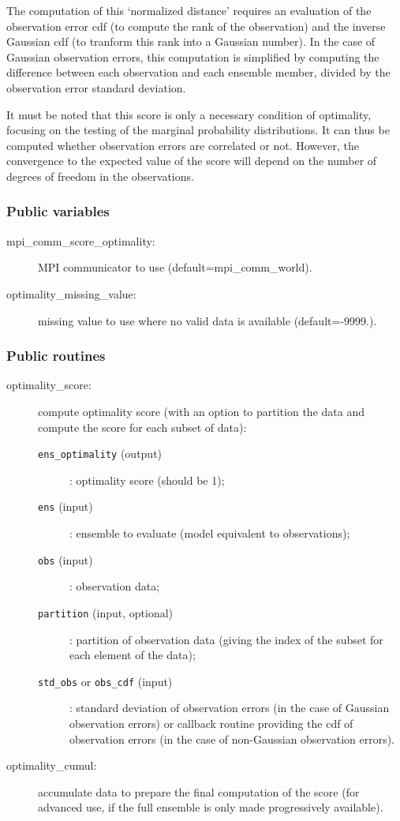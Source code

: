 \documentclass[11pt]{article}
\begin{document}
The computation of this `normalized distance' requires an evaluation
of the observation error cdf (to compute the rank of the observation)
and the inverse Gaussian cdf (to tranform this rank into a Gaussian number).
In the case of Gaussian observation errors, this computation is simplified
by computing the difference between each observation and each ensemble member,
divided by the observation error standard deviation.

It must be noted that this score is only a necessary condition of optimality,
focusing on the testing of the marginal probability distributions.
It can thus be computed whether observation errors are correlated or not.
However, the convergence to the expected value of the score
will depend on the number of degrees of freedom in the observations.

\subsubsection*{Public variables}

\begin{description}
\item[mpi\_comm\_score\_optimality:] MPI communicator to use (default=mpi\_comm\_world).
\item[optimality\_missing\_value:] missing value to use where no valid data is available (default=-9999.).
\end{description}

\subsubsection*{Public routines}

\begin{description}
\item[optimality\_score:] compute optimality score (with an option to partition the data
                    and compute the score for each subset of data):
  \begin{description}
  \item[{\tt ens\_optimality} (output)]: optimality score (should be 1);
  \item[{\tt ens} (input)]: ensemble to evaluate (model equivalent to observations);
  \item[{\tt obs} (input)]: observation data;
  \item[{\tt partition} (input, optional)]: partition of observation data
                                  (giving the index of the subset for each element of the data);
  \item[{\tt std\_obs} or {\tt obs\_cdf} (input)]: standard deviation of observation errors
                            (in the case of Gaussian observation errors) or
                            callback routine providing the cdf of observation errors
                            (in the case of non-Gaussian observation errors).
  \end{description}
\item[optimality\_cumul:] accumulate data to prepare the final computation of the score
                    (for advanced use, if the full ensemble is only made progressively available).
\end{description}
\end{document}
